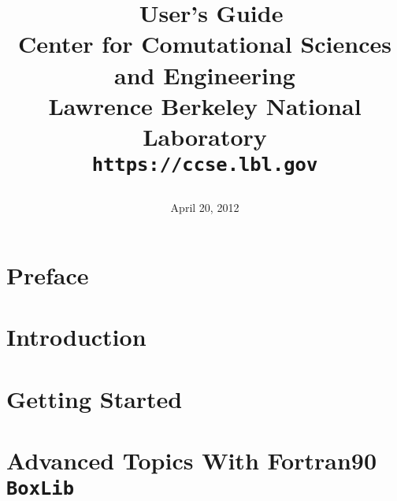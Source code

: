 \documentclass[11pt]{book}
\title{\Huge{\bf \BoxLib\ User's Guide}\\
       \vspace{0.5in}
       \Large{Center for Comutational Sciences and Engineering}\\
       \Large{Lawrence Berkeley National Laboratory}\\
       \Large{\tt https://ccse.lbl.gov}
       \date{April 20, 2012}}
\makeatletter
\newcommand{\BoxLib}{{\tt BoxLib}}
\renewcommand*\cleardoublepage{\clearpage\if@twoside
\ifodd\c@page\else
\hbox{}
\thispagestyle{empty}
\newpage
\if@twocolumn\hbox{}\newpage\fi\fi\fi}
\makeatother
\begin{document}
\frontmatter

\maketitle

\cleardoublepage

\setcounter{tocdepth}{1}
\tableofcontents

\cleardoublepage


\cleardoublepage

\chapter*{Preface}


\mainmatter

\chapter{Introduction}


\chapter{Getting Started}\label{Chap:Getting Started}


\chapter{Advanced Topics With Fortran90 \BoxLib}

\end{document}
